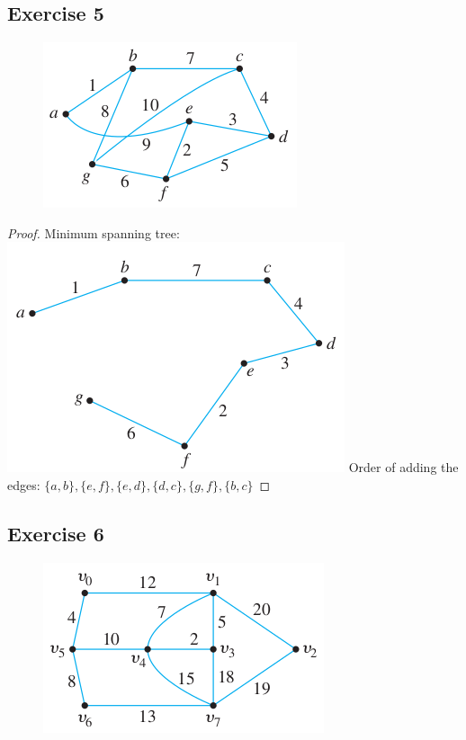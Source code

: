 \documentclass[14pt]{extarticle}
\begin{document}
\subsection{Exercise 5}
\begin{figure}[ht!]
    \centering
    \includegraphics[scale=0.5]{../images/10.6.5.png}
\end{figure}

\begin{proof}
    Minimum spanning tree:
    \includegraphics[scale=0.5]{../images/10.6.5.2.png}
    Order of adding the edges: \(\{a, b\}, \{e, f\}, \{e, d\}, \{d, c\}, \{g, f\}, \{b, c\}\)
\end{proof}

\subsection{Exercise 6}
\begin{figure}[ht!]
    \centering
    \includegraphics[scale=0.5]{../images/10.6.6.png}
\end{figure}
\end{document}
